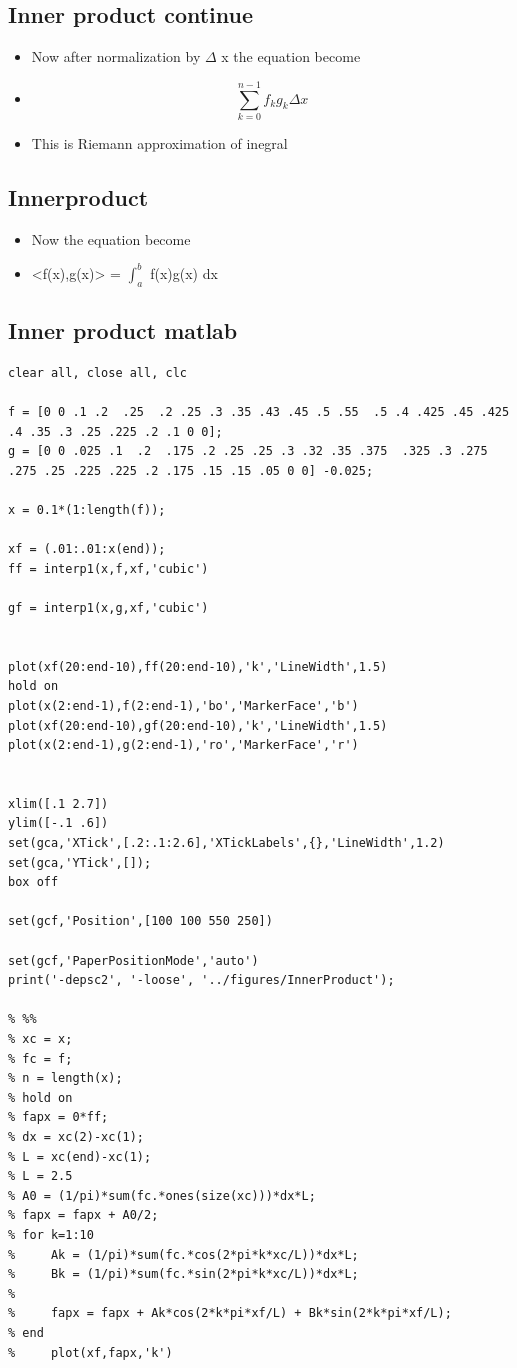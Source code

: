\documentclass[11pt]{article}
\begin{document}
\subsection{Inner product continue}
\label{sec:orga80abb4}
\begin{itemize}
\item Now after normalization by \(\Delta\) x the equation become
\item \[\sum_{k=0}^{n-1} f_kg_k\Delta x\]
\item This is Riemann approximation of inegral
\end{itemize}
\subsection{Innerproduct}
\label{sec:org171eaea}
\begin{itemize}
\item Now the equation become
\item <f(x),g(x)> = \(\int_a^b\) f(x)g(x) dx
\end{itemize}
\subsection{Inner product matlab}
\label{sec:org4c4737c}
\begin{verbatim}
clear all, close all, clc

f = [0 0 .1 .2  .25  .2 .25 .3 .35 .43 .45 .5 .55  .5 .4 .425 .45 .425 .4 .35 .3 .25 .225 .2 .1 0 0];
g = [0 0 .025 .1  .2  .175 .2 .25 .25 .3 .32 .35 .375  .325 .3 .275 .275 .25 .225 .225 .2 .175 .15 .15 .05 0 0] -0.025;

x = 0.1*(1:length(f));

xf = (.01:.01:x(end));
ff = interp1(x,f,xf,'cubic')

gf = interp1(x,g,xf,'cubic')


plot(xf(20:end-10),ff(20:end-10),'k','LineWidth',1.5)
hold on
plot(x(2:end-1),f(2:end-1),'bo','MarkerFace','b')
plot(xf(20:end-10),gf(20:end-10),'k','LineWidth',1.5)
plot(x(2:end-1),g(2:end-1),'ro','MarkerFace','r')


xlim([.1 2.7])
ylim([-.1 .6])
set(gca,'XTick',[.2:.1:2.6],'XTickLabels',{},'LineWidth',1.2)
set(gca,'YTick',[]);
box off

set(gcf,'Position',[100 100 550 250])

set(gcf,'PaperPositionMode','auto')
print('-depsc2', '-loose', '../figures/InnerProduct');

% %%
% xc = x;
% fc = f;
% n = length(x);
% hold on
% fapx = 0*ff;
% dx = xc(2)-xc(1);
% L = xc(end)-xc(1);
% L = 2.5
% A0 = (1/pi)*sum(fc.*ones(size(xc)))*dx*L;
% fapx = fapx + A0/2;
% for k=1:10
%     Ak = (1/pi)*sum(fc.*cos(2*pi*k*xc/L))*dx*L;
%     Bk = (1/pi)*sum(fc.*sin(2*pi*k*xc/L))*dx*L;
% 
%     fapx = fapx + Ak*cos(2*k*pi*xf/L) + Bk*sin(2*k*pi*xf/L);
% end
%     plot(xf,fapx,'k')

\end{verbatim}
\end{document}
